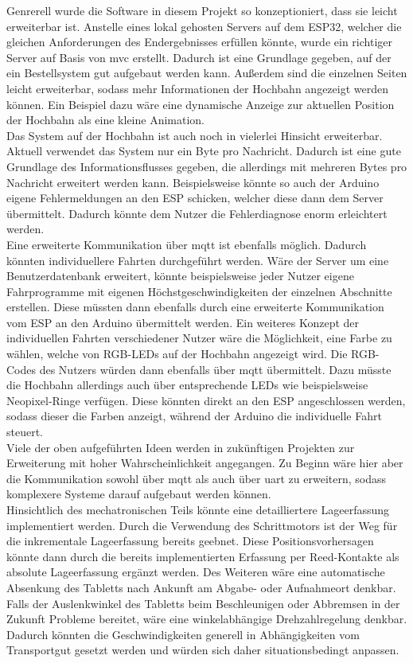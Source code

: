 Genrerell wurde die Software in diesem Projekt so konzeptioniert, dass sie leicht erweiterbar ist. Anstelle eines lokal gehosten Servers auf dem ESP32, welcher die gleichen Anforderungen des Endergebnisses erfüllen könnte, wurde ein richtiger Server auf Basis von \acrshort{mvc} erstellt. Dadurch ist eine Grundlage gegeben, auf der ein Bestellsystem gut aufgebaut werden kann. Außerdem sind die einzelnen Seiten leicht erweiterbar, sodass mehr Informationen der Hochbahn angezeigt werden können. Ein Beispiel dazu wäre eine dynamische Anzeige zur aktuellen Position der Hochbahn als eine kleine Animation. \\
Das System auf der Hochbahn ist auch noch in vielerlei Hinsicht erweiterbar. Aktuell verwendet das System nur ein Byte pro Nachricht. Dadurch ist eine gute Grundlage des Informationsflusses gegeben, die allerdings mit mehreren Bytes pro Nachricht erweitert werden kann. Beispielsweise könnte so auch der Arduino eigene Fehlermeldungen an den ESP schicken, welcher diese dann dem Server übermittelt. Dadurch könnte dem Nutzer die Fehlerdiagnose enorm erleichtert werden. \\
Eine erweiterte Kommunikation über \acrshort{mqtt} ist ebenfalls möglich. Dadurch könnten individuellere Fahrten durchgeführt werden. Wäre der Server um eine Benutzerdatenbank erweitert, könnte beispielsweise jeder Nutzer eigene Fahrprogramme mit eigenen Höchstgeschwindigkeiten der einzelnen Abschnitte erstellen. Diese müssten dann ebenfalls durch eine erweiterte Kommunikation vom ESP an den Arduino übermittelt werden. Ein weiteres Konzept der individuellen Fahrten verschiedener Nutzer wäre die Möglichkeit, eine Farbe zu wählen, welche von RGB-LEDs auf der Hochbahn angezeigt wird. Die RGB-Codes des Nutzers würden dann ebenfalls über \acrshort{mqtt} übermittelt. Dazu müsste die Hochbahn allerdings auch über entsprechende LEDs wie beispielsweise Neopixel-Ringe verfügen. Diese könnten direkt an den ESP angeschlossen werden, sodass dieser die Farben anzeigt, während der Arduino die individuelle Fahrt steuert. \\
Viele der oben aufgeführten Ideen werden in zukünftigen Projekten zur Erweiterung mit hoher Wahrscheinlichkeit angegangen. Zu Beginn wäre hier aber die Kommunikation sowohl über \acrshort{mqtt} als auch über \acrshort{uart} zu erweitern, sodass komplexere Systeme darauf aufgebaut werden können.\\

Hinsichtlich des mechatronischen Teils könnte eine detailliertere Lageerfassung implementiert werden. Durch die Verwendung des Schrittmotors ist der Weg für die inkrementale Lageerfassung bereits geebnet. Diese Positionsvorhersagen könnte dann durch die bereits implementierten Erfassung per Reed-Kontakte als absolute Lageerfassung ergänzt werden. Des Weiteren wäre eine automatische Absenkung des Tabletts nach Ankunft am Abgabe- oder Aufnahmeort denkbar. Falls der Auslenkwinkel des Tabletts beim Beschleunigen oder Abbremsen in der Zukunft Probleme bereitet, wäre eine winkelabhängige Drehzahlregelung denkbar. Dadurch könnten die Geschwindigkeiten generell in Abhängigkeiten vom Transportgut gesetzt werden und würden sich daher situationsbedingt anpassen. 


